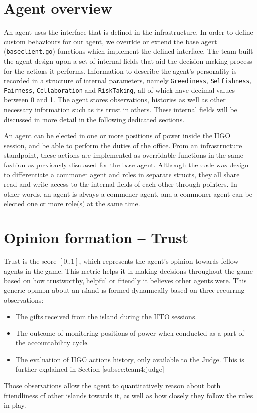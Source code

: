 \section{Agent overview}
An agent uses the interface that is defined in the infrastructure. In order to define custom behaviours for our agent, we override or extend the base agent (\texttt{baseclient.go}) functions which implement the defined interface. The team built the agent design upon a set of internal fields that aid the decision-making process for the actions it performs. Information to describe the agent's personality is recorded in a structure of internal parameters, namely \texttt{Greediness}, \texttt{Selfishness}, \texttt{Fairness}, \texttt{Collaboration} and \texttt{RiskTaking}, all of which have decimal values between 0 and 1. The agent stores observations, histories as well as other necessary information such as its trust in others. These internal fields will be discussed in more detail in the following dedicated sections. %

An agent can be elected in one or more positions of power inside the IIGO session, and be able to perform the duties of the office. From an infrastructure standpoint, these actions are implemented as overridable functions in the same fashion as previously discussed for the base agent. Although the code was design to differentiate a commoner agent and roles in separate structs, they all share read and write access to the internal fields of each other through pointers. In other words, an agent is always a commoner agent, and a commoner agent can be elected one or more role(s) at the same time.

\section{Opinion formation -- Trust}
\label{sec:team4:trust}
Trust is the score $[0..1]$, which represents the agent's opinion towards fellow agents in the game. This metric helps it in making decisions throughout the game based on how trustworthy, helpful or friendly it believes other agents were. This generic opinion about an island is formed dynamically based on three recurring observations:
\begin{itemize}
    \item The gifts received from the island during the IITO sessions.
    \item The outcome of monitoring positions-of-power when conducted as a part of the accountability cycle.
    \item The evaluation of IIGO actions history, only available to the Judge. This is further explained in Section \ref{subsec:team4:judge}
\end{itemize}
Those observations allow the agent to quantitatively reason about both friendliness of other islands towards it, as well as how closely they follow the rules in play.

